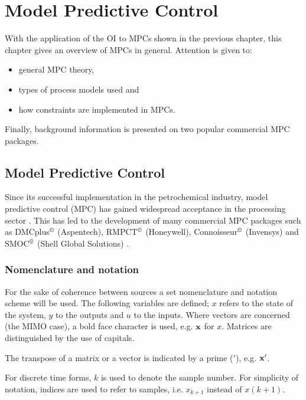 \chapter{Model Predictive Control}\label{chap:background}
\begin{overview}
  With the application of the OI to MPCs shown in the previous chapter, this chapter gives an overview of MPCs in general.
Attention is given to:
\begin{itemize}
  \item general MPC theory,
  \item types of process models used and
  \item how constraints are implemented in MPCs.
\end{itemize}
Finally, background information is presented on two popular commercial MPC packages.
\end{overview}

\section{Model Predictive Control}\label{sec:mpclit}
Since its successful implementation in the petrochemical industry, model predictive control (MPC) has gained widespread acceptance in the processing sector \citep[1]{maciejowskimpc}. 
This has led to the development of many commercial MPC packages such as DMCplus$^{\copyright}$ (Aspentech), RMPCT$^{\copyright}$ (Honeywell), Connoisseur$^{\copyright}$ (Invensys) and SMOC$^{\copyright}$ (Shell Global Solutions) \citep{qinbadgwell}.%
%
%
\subsection{Nomenclature and notation}
For the sake of coherence between sources a set nomenclature and notation scheme will be used. 
The following variables are defined; $x$ refers to the state of the system, $y$ to the outputs and $u$ to the inputs.
Where vectors are concerned (the MIMO case), a bold face character is used, e.g. ${\bf {x}}$ for $x$.
Matrices are distinguished by the use of capitals.

The transpose of a matrix or a vector is indicated by a prime ($'$), e.g. ${\bf {x}}'$.

For discrete time forms, $k$ is used to denote the sample number.
For simplicity of notation, indices are used to refer to samples, i.e. $x_{k+1}$ instead of $x(k+1)$.
